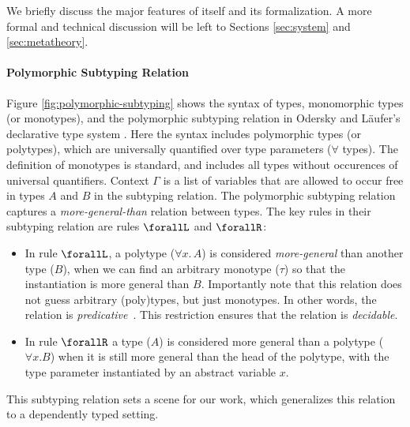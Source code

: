 We briefly discuss the major features of \name itself and
its formalization. A more formal and technical discussion will be left to
Sections \ref{sec:system} and \ref{sec:metatheory}.

\paragraph{Polymorphic Subtyping Relation}
Figure \ref{fig:polymorphic-subtyping} shows the syntax of types, monomorphic types (or monotypes),
and the polymorphic subtyping relation in
Odersky and L\"aufer's declarative type system \cite{odersky1996putting}.
Here the syntax includes polymorphic types (or polytypes), which are universally quantified over type parameters
($\forall$ types). The definition of monotypes
is standard, and includes all types without occurences of universal quantifiers.
Context $\Gamma$ is a list of variables that are allowed to occur free in types
$A$ and $B$ in the subtyping relation.
The polymorphic subtyping relation captures a \emph{more-general-than} relation
between types. The key rules in their subtyping relation are rules $\forallL$
and $\forallR$:

\begin{itemize}
  \item In rule $\forallL$, a polytype ($\forall x.\, A$) is considered \emph{more-general}
        than another type ($B$), when we can find an arbitrary monotype ($\tau$)
        so that the instantiation is more general than $B$.
        Importantly note that this relation does not guess arbitrary (poly)types,
        but just monotypes. In other words, the relation is \emph{predicative}~\cite{Martin-Lof-1972}.
        This restriction ensures that the relation is \emph{decidable}.

  \item In rule $\forallR$ a type ($A$) is considered more general than a polytype ($\forall x. B$)
        when it is still more general than the head of the polytype, with the type
        parameter instantiated by an abstract variable $x$.
\end{itemize}

This subtyping relation sets a scene for our work, which
generalizes this relation to a dependently typed setting.

